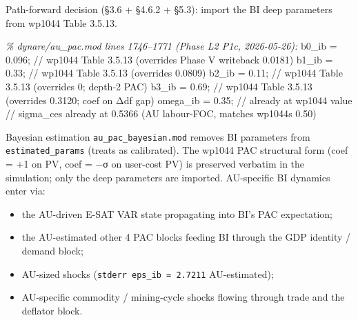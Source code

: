 \documentclass[
]{article}
\newenvironment{Shaded}{}{}
\newcommand{\CommentTok}[1]{\textcolor[rgb]{0.38,0.63,0.69}{\textit{#1}}}
\newcommand{\FloatTok}[1]{\textcolor[rgb]{0.25,0.63,0.44}{#1}}
\newcommand{\NormalTok}[1]{#1}
\newcommand{\OperatorTok}[1]{\textcolor[rgb]{0.40,0.40,0.40}{#1}}
\newcommand{\VariableTok}[1]{\textcolor[rgb]{0.10,0.09,0.49}{#1}}
\providecommand{\tightlist}{%
  \setlength{\itemsep}{0pt}\setlength{\parskip}{0pt}}
\begin{document}
Path-forward decision (§3.6 + §4.6.2 + §5.3): import the BI deep
parameters from wp1044 Table 3.5.13.

\begin{Shaded}
\begin{Highlighting}[]
\CommentTok{\% dynare/au\_pac.mod lines 1746–1771 (Phase L2 P1c, 2026{-}05{-}26):}
\VariableTok{b0\_ib}    \OperatorTok{=} \FloatTok{0.096}\OperatorTok{;}   \OperatorTok{//} \VariableTok{wp1044} \VariableTok{Table} \FloatTok{3.5.13}\NormalTok{ (}\VariableTok{overrides} \VariableTok{Phase} \VariableTok{V} \VariableTok{writeback} \FloatTok{0.0181}\NormalTok{)}
\VariableTok{b1\_ib}    \OperatorTok{=} \FloatTok{0.33}\OperatorTok{;}    \OperatorTok{//} \VariableTok{wp1044} \VariableTok{Table} \FloatTok{3.5.13}\NormalTok{ (}\VariableTok{overrides} \FloatTok{0.0809}\NormalTok{)}
\VariableTok{b2\_ib}    \OperatorTok{=} \FloatTok{0.11}\OperatorTok{;}    \OperatorTok{//} \VariableTok{wp1044} \VariableTok{Table} \FloatTok{3.5.13}\NormalTok{ (}\VariableTok{overrides} \FloatTok{0}\OperatorTok{;} \VariableTok{depth}\OperatorTok{{-}}\FloatTok{2} \VariableTok{PAC}\NormalTok{)}
\VariableTok{b3\_ib}    \OperatorTok{=} \FloatTok{0.69}\OperatorTok{;}    \OperatorTok{//} \VariableTok{wp1044} \VariableTok{Table} \FloatTok{3.5.13}\NormalTok{ (}\VariableTok{overrides} \FloatTok{0.3120}\OperatorTok{;} \VariableTok{coef} \VariableTok{on}\NormalTok{ Δ}\VariableTok{df} \VariableTok{gap}\NormalTok{)}
\VariableTok{omega\_ib} \OperatorTok{=} \FloatTok{0.35}\OperatorTok{;}    \OperatorTok{//} \VariableTok{already} \VariableTok{at} \VariableTok{wp1044} \VariableTok{value}
\OperatorTok{//} \VariableTok{sigma\_ces} \VariableTok{already} \VariableTok{at} \FloatTok{0.5366}\NormalTok{ (}\VariableTok{AU} \VariableTok{labour}\OperatorTok{{-}}\VariableTok{FOC}\OperatorTok{,} \VariableTok{matches} \VariableTok{wp1044}\OperatorTok{\textquotesingle{}}\VariableTok{s} \FloatTok{0.50}\NormalTok{)}
\end{Highlighting}
\end{Shaded}

Bayesian estimation \texttt{au\_pac\_bayesian.mod} removes BI parameters
from \texttt{estimated\_params} (treats as calibrated). The wp1044 PAC
structural form (coef = +1 on PV, coef = −σ on user-cost PV) is
preserved verbatim in the simulation; only the deep parameters are
imported. AU-specific BI dynamics enter via:

\begin{itemize}
\tightlist
\item
  the AU-driven E-SAT VAR state propagating into BI's PAC expectation;
\item
  the AU-estimated other 4 PAC blocks feeding BI through the GDP
  identity / demand block;
\item
  AU-sized shocks (\texttt{stderr\ eps\_ib\ =\ 2.7211} AU-estimated);
\item
  AU-specific commodity / mining-cycle shocks flowing through trade and
  the deflator block.
\end{itemize}
\end{document}
